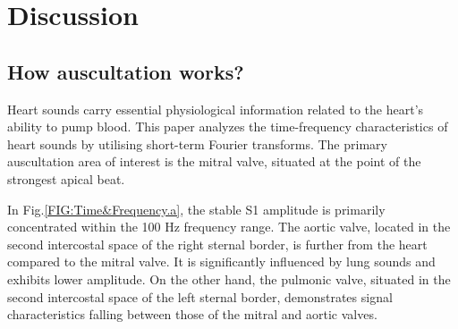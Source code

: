 \section{Discussion}\label{Discussion}
\subsection{How auscultation works?}
Heart sounds carry essential physiological information related to the heart's ability to pump blood. This paper analyzes the time-frequency characteristics of heart sounds by utilising short-term Fourier transforms. The primary auscultation area of interest is the mitral valve, situated at the point of the strongest apical beat.

In Fig.\ref{FIG:Time&Frequency.a}, the stable S1 amplitude is primarily concentrated within the 100 Hz frequency range. The aortic valve, located in the second intercostal space of the right sternal border, is further from the heart compared to the mitral valve. It is significantly influenced by lung sounds and exhibits lower amplitude. On the other hand, the pulmonic valve, situated in the second intercostal space of the left sternal border, demonstrates signal characteristics falling between those of the mitral and aortic valves.


